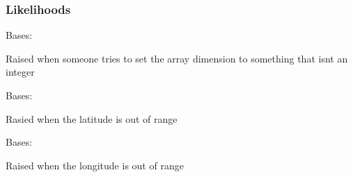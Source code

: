 \documentclass[letterpaper,10pt,english]{sphinxmanual}
\begin{document}
\subsubsection{Likelihoods}
\label{\detokenize{infrapy.propagation:module-infrapy.propagation.likelihoods}}\label{\detokenize{infrapy.propagation:likelihoods}}

\begin{fulllineitems}
\label{\detokenize{infrapy.propagation:infrapy.propagation.likelihoods.BadArrayDimensionError}}
Bases: {\hyperref[\detokenize{infrapy.propagation:infrapy.propagation.likelihoods.CustomError}]{}}

Raised when someone tries to set the array dimension to something that isnt an integer

\end{fulllineitems}


\begin{fulllineitems}
\label{\detokenize{infrapy.propagation:infrapy.propagation.likelihoods.BadLatitudeError}}
Bases: {\hyperref[\detokenize{infrapy.propagation:infrapy.propagation.likelihoods.CustomError}]{}}

Rasied when the latitude is out of range

\end{fulllineitems}


\begin{fulllineitems}
\label{\detokenize{infrapy.propagation:infrapy.propagation.likelihoods.BadLongitudeError}}
Bases: {\hyperref[\detokenize{infrapy.propagation:infrapy.propagation.likelihoods.CustomError}]{}}

Raised when the longitude is out of range

\end{fulllineitems}
\end{document}
